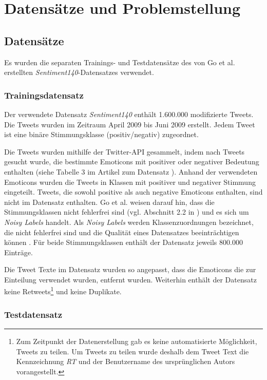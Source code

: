 \section{Datensätze und Problemstellung}\label{sec:datensätzeundproblemstellung}

\subsection{Datensätze}

Es wurden die separaten Trainings- und Testdatensätze des von Go et al. \cite{go2009twitter} erstellten \textit{Sentiment140}-Datensatzes verwendet.

\subsubsection{Trainingsdatensatz}\label{subsec:trainingsdatensatz}
Der verwendete Datensatz \textit{Sentiment140} enthält 1.600.000 modifizierte Tweets.
Die Tweets wurden im Zeitraum April 2009 bis Juni 2009 erstellt.
Jedem Tweet ist eine binäre Stimmungsklasse (positiv/negativ) zugeordnet.

Die Tweets wurden mithilfe der Twitter-API gesammelt, indem nach Tweets gesucht wurde, die bestimmte Emoticons mit positiver oder negativer Bedeutung enthalten (siehe Tabelle 3 im Artikel zum Datensatz \cite[S. 4]{go2009twitter}).
Anhand der verwendeten Emoticons wurden die Tweets in Klassen mit positiver und negativer Stimmung eingeteilt.
Tweets, die sowohl positive als auch negative Emoticons enthalten, sind nicht im Datensatz enthalten.
Go et al. \cite{go2009twitter} weisen darauf hin, dass die Stimmungsklassen nicht fehlerfrei sind (vgl. Abschnitt 2.2 in \cite{gow009twitter}) und es sich um \textit{Noisy Labels} handelt.
Als \textit{Noisy Labels} werden Klassenzuordnungen bezeichnet, die nicht fehlerfrei sind und die Qualität eines Datensatzes beeinträchtigen können \cite{song2022learning}.
Für beide Stimmungsklassen enthält der Datensatz jeweils 800.000 Einträge.

Die Tweet Texte im Datensatz wurden so angepasst, dass die Emoticons die zur Einteilung verwendet wurden, entfernt wurden.
Weiterhin enthält der Datensatz keine Retweets\footnote{
    Zum Zeitpunkt der Datenerstellung gab es keine automatisierte Möglichkeit, Tweets zu teilen.
    Um Tweets zu teilen wurde deshalb dem Tweet Text die Kennzeichnung \textit{RT} und der Benutzername des ursprünglichen Autors vorangestellt.
} und keine Duplikate.

\subsubsection{Testdatensatz}\label{subsec:testdata}

